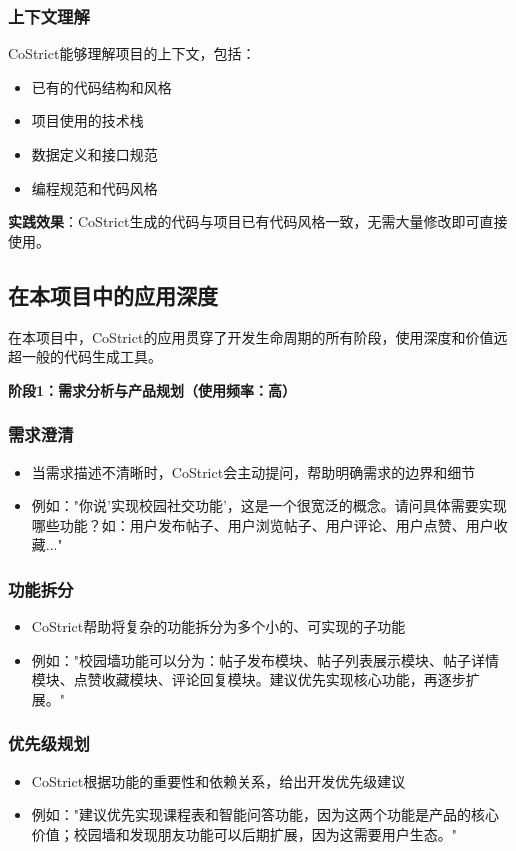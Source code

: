 \documentclass[12pt,a4paper]{article}
\begin{document}
\subsubsection{上下文理解}

CoStrict能够理解项目的上下文，包括：
\begin{itemize}
    \item 已有的代码结构和风格
    \item 项目使用的技术栈
    \item 数据定义和接口规范
    \item 编程规范和代码风格
\end{itemize}

\textbf{实践效果}：CoStrict生成的代码与项目已有代码风格一致，无需大量修改即可直接使用。

\subsection{在本项目中的应用深度}

在本项目中，CoStrict的应用贯穿了开发生命周期的所有阶段，使用深度和价值远超一般的代码生成工具。

\textbf{阶段1：需求分析与产品规划（使用频率：高）}

\subsubsection{需求澄清}
\begin{itemize}
    \item 当需求描述不清晰时，CoStrict会主动提问，帮助明确需求的边界和细节
    \item 例如："你说'实现校园社交功能'，这是一个很宽泛的概念。请问具体需要实现哪些功能？如：用户发布帖子、用户浏览帖子、用户评论、用户点赞、用户收藏..."
\end{itemize}

\subsubsection{功能拆分}
\begin{itemize}
    \item CoStrict帮助将复杂的功能拆分为多个小的、可实现的子功能
    \item 例如："校园墙功能可以分为：帖子发布模块、帖子列表展示模块、帖子详情模块、点赞收藏模块、评论回复模块。建议优先实现核心功能，再逐步扩展。"
\end{itemize}

\subsubsection{优先级规划}
\begin{itemize}
    \item CoStrict根据功能的重要性和依赖关系，给出开发优先级建议
    \item 例如："建议优先实现课程表和智能问答功能，因为这两个功能是产品的核心价值；校园墙和发现朋友功能可以后期扩展，因为这需要用户生态。"
\end{itemize}
\end{document}
